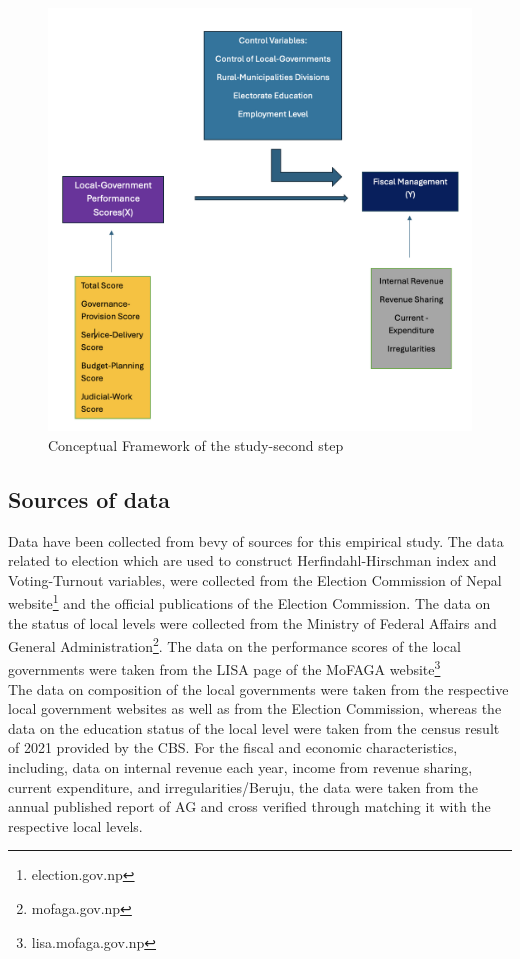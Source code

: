 \begin{figure}[h!]
\centering
\hspace{-1cm}
\includegraphics[width = 160mm, scale = 0.35]{figure/Conframe2.png}
\caption{Conceptual Framework of the study-second step}
\label{Conceptual Framework step 2}
\end{figure}

\subsection{Sources of data}
Data have been collected from bevy of sources for this empirical study. The data related to election which are used to construct Herfindahl-Hirschman index and Voting-Turnout variables, were collected from the Election Commission of Nepal website\footnote{election.gov.np} and the official publications of the Election Commission. The data on the status of local levels were collected from the Ministry of Federal Affairs and General Administration\footnote{mofaga.gov.np}. The data on the performance scores of the local governments were taken from the LISA page of the MoFAGA website\footnote{lisa.mofaga.gov.np}  \\
The data on  composition of the local governments were taken from the respective local government websites as well as from the Election Commission, whereas the data on the education status of the local level were taken from the census result of 2021 provided by the CBS. For the fiscal and economic characteristics, including, data on internal revenue each year, income from revenue sharing, current expenditure, and irregularities/Beruju, the data were taken from the annual published report of AG and cross verified through matching it with the respective local levels.
\vspace{-5mm}

